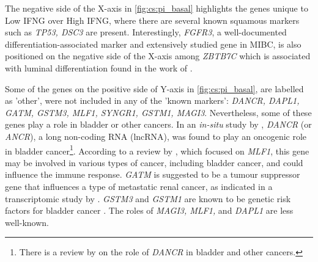 The negative side of the X-axis in \cref{fig:cs:pi_basal} highlights the genes unique to Low IFNG over High IFNG, where there are several known squamous markers such as \textit{TP53, DSC3} are present. Interestingly, \textit{FGFR3}, a well-documented differentiation-associated marker and extensively studied gene in MIBC, is also positioned on the negative side of the X-axis among \textit{ZBTB7C} which is associated with luminal differentiation found in the work of \citet{Ramal2024-ha}.

Some of the genes on the positive side of Y-axis in \cref{fig:cs:pi_basal}, 
are labelled as 'other', were not included in any of the 'known markers': \textit{DANCR, DAPL1, GATM, GSTM3, MLF1, SYNGR1, GSTM1, MAGI3}. Nevertheless, some of these genes play a role in bladder or other cancers. In an \textit{in-situ} study by \citet{Zhan2018-um}, \textit{DANCR} (or \textit{ANCR}), a long non-coding RNA (lncRNA), was found to play an oncogenic role in bladder cancer\footnote{There is a review by \citet{Wang2021-gn} on the role of \textit{DANCR} in bladder and other cancers.}. According to a review by \citet{Li2023-mk}, which focused on \textit{MLF1}, this gene may be involved in various types of cancer, including bladder cancer, and could influence the immune response. \textit{GATM} is suggested to be a tumour suppressor gene that influences a type of metastatic renal cancer, as indicated in a transcriptomic study by \citet{Jee2022-wi}. \textit{GSTM3} and \textit{GSTM1} are known to be genetic risk factors for bladder cancer \citet{Schnakenberg2000-cu}. The roles of \textit{MAGI3, MLF1,} and \textit{DAPL1} are less well-known.

